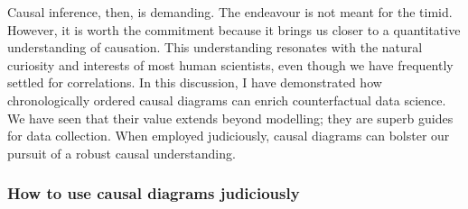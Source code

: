 \documentclass[
  singlecolumn]{article}
\begin{document}
Causal inference, then, is demanding. The endeavour is not meant for the
timid. However, it is worth the commitment because it brings us closer
to a quantitative understanding of causation. This understanding
resonates with the natural curiosity and interests of most human
scientists, even though we have frequently settled for correlations. In
this discussion, I have demonstrated how chronologically ordered causal
diagrams can enrich counterfactual data science. We have seen that their
value extends beyond modelling; they are superb guides for data
collection. When employed judiciously, causal diagrams can bolster our
pursuit of a robust causal understanding.

\hypertarget{how-to-use-causal-diagrams-judiciously}{%
\subsubsection{How to use causal diagrams
judiciously}\label{how-to-use-causal-diagrams-judiciously}}
\end{document}
